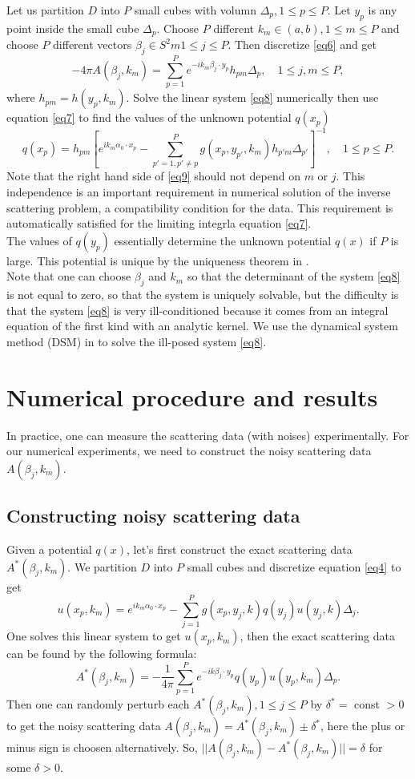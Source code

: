 \documentclass[12pt]{article}
\theoremstyle{plain}
\def\be{\begin{equation}}
\def\ee{\end{equation}}
\begin{document}
Let us partition $D$ into $P$ small cubes with volumn $\Delta_p, 1 \leq p \leq P$. Let $y_p$ is any point inside the small cube $\Delta_p$. Choose $P$ different $k_m \in (a,b), 1 \leq m \leq P$ and choose $P$ different vectors $\beta_j \in S^2m 1 \leq j \leq P$. Then discretize \eqref{eq6} and get
\be\label{eq8}
-4\pi A(\beta_j, k_m) = \sum_{p = 1}^P e^{-ik_m\beta_j\cdot y_p}h_{pm}\Delta_p, \quad 1 \leq j,m \leq P,
\ee
where $h_{pm} = h(y_p, k_m)$. Solve the linear system \eqref{eq8} numerically then use equation \eqref{eq7} to find the values of the unknown potential $q(x_p)$
\be\label{eq9}
q(x_p) = h_{pm}\left[ e^{ik_m\alpha_0\cdot x_p} - \sum_{p' = 1, p' \neq p}^P g(x_p, y_{p'}, k_m)h_{p'm}\Delta_{p'} \right]^{-1}, \quad 1 \leq p \leq P.
\ee
Note that the right hand side of \eqref{eq9} should not depend on $m$ or $j$. This independence is an important requirement in numerical solution of the inverse scattering problem, a compatibility condition for the data. This requirement is automatically satisfied for the limiting integrla equation \eqref{eq7}.\\

The values of $q(y_p)$ essentially determine the unknown potential $q(x)$ if $P$ is large. This potential is unique by the uniqueness theorem in \cite{R603}.\\

Note that one can choose $\beta_j$ and $k_m$ so that the determinant of the system \eqref{eq8} is not equal to zero, so that the system is uniquely solvable, but the difficulty is that the system \eqref{eq8} is very ill-conditioned because it comes from an integral equation of the first kind with an analytic kernel. We use the dynamical system method (DSM) in \cite{R526} to solve the ill-posed system \eqref{eq8}.


\section{Numerical procedure and results}\label{sec3}
In practice, one can measure the scattering data (with noises) experimentally. For our numerical experiments, we need to construct the noisy scattering data $A(\beta_j, k_m)$.
\subsection{Constructing noisy scattering data}\label{sec3.1}
Given a potential $q(x)$, let's first construct the exact scattering data $A^*(\beta_j, k_m)$. We partition $D$ into $P$ small cubes and discretize equation \eqref{eq4} to get
\be\label{eq10}
u(x_p,k_m) = e^{ik_m \alpha_0 \cdot x_p} - \sum_{j = 1}^P g(x_p,y_j,k)q(y_j)u(y_j,k)\Delta_j.
\ee
One solves this linear system to get $u(x_p, k_m)$, then the exact scattering data can be found by the following formula:
\be\label{eq11}
A^*(\beta_j, k_m) = -\frac{1}{4\pi}\sum_{p = 1}^P e^{-ik\beta_j\cdot y_p}q(y_p)u(y_p, k_m)\Delta_p.
\ee
Then one can randomly perturb each $A^*(\beta_j, k_m), 1 \leq j \leq P$ by $\delta^* = $ const $> 0$ to get the noisy scattering data $A(\beta_j, k_m) = A^*(\beta_j, k_m) \pm \delta^*$, here the plus or minus sign is choosen alternatively. So, $||A(\beta_j,k_m) - A^*(\beta_j,k_m)|| = \delta$ for some $\delta > 0$.
\end{document}
